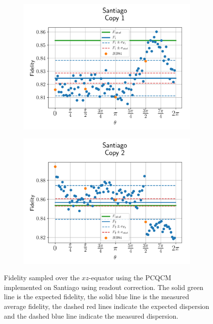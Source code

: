 \begin{figure}[H]
  \centering
  \begin{subfigure}{.5\textwidth}
    \centering
    \includegraphics[width=\textwidth]{Figures/PhaseCovariant/IBM/OnlyEquator/results_corrected_santiago_copy1.png}
    \label{fig:pc_corrected_santiago_equator_1}
  \end{subfigure}%
  \begin{subfigure}{.5\textwidth}
    \centering
    \includegraphics[width=\textwidth]{Figures/PhaseCovariant/IBM/OnlyEquator/results_corrected_santiago_copy2.png}
    \label{fig:pc_corrected_santiago_equator_2}
  \end{subfigure}
  \vspace{-0.5cm}
  \caption{Fidelity sampled over the $xz$-equator using the PCQCM implemented on Santiago using readout correction. The solid green line is the expected fidelity, the solid blue line is the measured average fidelity, the dashed red lines indicate the expected dispersion and the dashed blue line indicate the measured dispersion.}
  \label{fig:pc_corrected_santiago_equator}
\end{figure}


